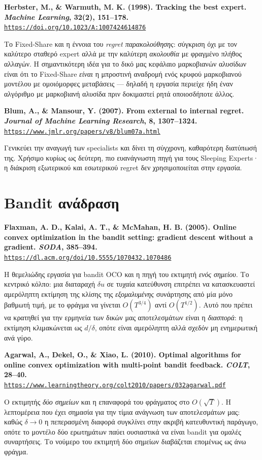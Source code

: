 \documentclass[11pt,a4paper]{article}
\newcommand{\src}[3]{%
  \par\medskip\noindent\textbf{#2}\\
  \href{#3}{\texttt{\small #3}}\par\smallskip}
\begin{document}
\src{herbster1998}{Herbster, M., \& Warmuth, M. K. (1998). Tracking the best expert.
\emph{Machine Learning}, 32(2), 151--178.}
{https://doi.org/10.1023/A:1007424614876}
Το Fixed-Share και η έννοια του \emph{regret παρακολούθησης}: σύγκριση όχι με τον καλύτερο
σταθερό expert αλλά με την καλύτερη \emph{ακολουθία} με φραγμένο πλήθος αλλαγών. Η
σημαντικότερη ιδέα για το δικό μας κεφάλαιο μαρκοβιανών αλυσίδων είναι ότι το Fixed-Share
\emph{είναι} η μπροστινή αναδρομή ενός κρυφού μαρκοβιανού μοντέλου με ομοιόμορφες
μεταβάσεις --- δηλαδή η εργασία περιείχε ήδη έναν αλγόριθμο με μαρκοβιανή αλυσίδα πριν
δοκιμαστεί ρητά οποιοσδήποτε άλλος.

\src{blum2007}{Blum, A., \& Mansour, Y. (2007). From external to internal regret.
\emph{Journal of Machine Learning Research}, 8, 1307--1324.}
{https://www.jmlr.org/papers/v8/blum07a.html}
Γενικεύει την αναγωγή των specialists και δίνει τη σύγχρονη, καθαρότερη διατύπωσή της.
Χρήσιμο κυρίως ως δεύτερη, πιο ευανάγνωστη πηγή για τους Sleeping Experts· η διάκριση
εξωτερικού και εσωτερικού regret δεν χρησιμοποιείται στην εργασία.

\section{Bandit ανάδραση}

\src{flaxman2005}{Flaxman, A. D., Kalai, A. T., \& McMahan, H. B. (2005). Online convex
optimization in the bandit setting: gradient descent without a gradient. \emph{SODA},
385--394.}
{https://dl.acm.org/doi/10.5555/1070432.1070486}
Η θεμελιώδης εργασία για bandit OCO και η πηγή του εκτιμητή \emph{ενός σημείου}. Το κεντρικό
κόλπο: μια διαταραχή $\delta u$ σε τυχαία κατεύθυνση επιτρέπει να κατασκευαστεί αμερόληπτη
εκτίμηση της κλίσης της \emph{εξομαλυμένης} συνάρτησης από μία μόνο βαθμωτή τιμή, με το
φράγμα να γίνεται $O(T^{3/4})$ αντί $O(T^{1/2})$. Αυτό που πρέπει να κρατηθεί για την
ερμηνεία των δικών μας αποτελεσμάτων είναι η \emph{διασπορά}: η εκτίμηση κλιμακώνεται ως
$d/\delta$, οπότε είναι αμερόληπτη αλλά σχεδόν μη ενημερωτική ανά γύρο.

\src{agarwal2010}{Agarwal, A., Dekel, O., \& Xiao, L. (2010). Optimal algorithms for online
convex optimization with multi-point bandit feedback. \emph{COLT}, 28--40.}
{https://www.learningtheory.org/colt2010/papers/032agarwal.pdf}
Ο εκτιμητής \emph{δύο σημείων} και η επαναφορά του φράγματος στο $O(\sqrt{T})$. Η λεπτομέρεια
που έχει σημασία για την τίμια ανάγνωση των αποτελεσμάτων μας: καθώς $\delta\to0$ η
πεπερασμένη διαφορά συγκλίνει στην ακριβή κατευθυντική παράγωγο, οπότε το μοντέλο δύο
ερωτημάτων παύει ουσιαστικά να είναι bandit για ομαλές συναρτήσεις. Το νούμερο του εκτιμητή
δύο σημείων διαβάζεται επομένως ως άνω φράγμα.
\end{document}

